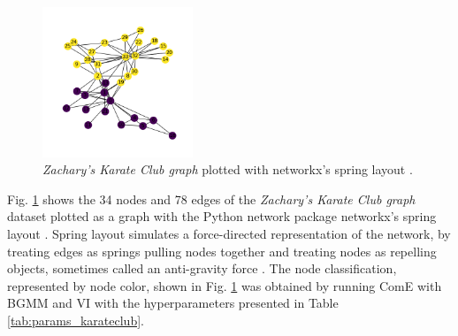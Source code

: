 \documentclass[conference]{IEEEtran}
\begin{document}
\begin{figure}[htbp]
    \centering
    \includegraphics[width=0.4\textwidth]{images/karateclub/spring.png}
    \caption{\textit{Zachary’s Karate Club graph} plotted with networkx's spring layout \cite{KarateClubDS, networkx}.}
    \label{fig:karateclub_spring}
\end{figure}

Fig. \ref{fig:karateclub_spring} shows the 34 nodes and 78 edges of the \textit{Zachary’s Karate Club graph} dataset plotted as a graph with the Python network package networkx's spring layout \cite{networkx}. Spring layout simulates a force-directed representation of the network, by treating edges as springs pulling nodes together and treating nodes as repelling objects, sometimes called an anti-gravity force \cite{networkx}. The node classification, represented by node color, shown in Fig. \ref{fig:karateclub_spring} was obtained by running ComE with BGMM and VI with the hyperparameters presented in Table \ref{tab:params_karateclub}.
\end{document}
